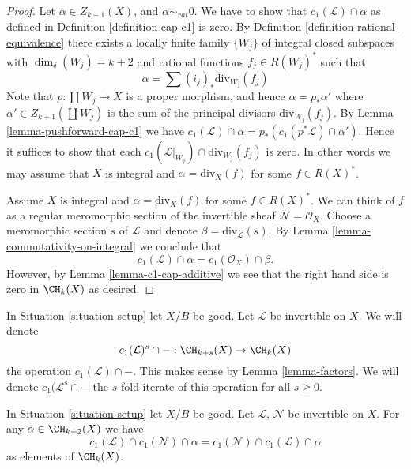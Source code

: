 \begin{proof}
Let $\alpha \in Z_{k + 1}(X)$, and $\alpha \sim_{rat} 0$.
We have to show that $c_1(\mathcal{L}) \cap \alpha$
as defined in Definition \ref{definition-cap-c1} is zero.
By Definition \ref{definition-rational-equivalence} there
exists a locally finite family $\{W_j\}$ of integral closed
subspaces with $\dim_\delta(W_j) = k + 2$ and rational functions
$f_j \in R(W_j)^*$ such that
$$
\alpha = \sum (i_j)_*\text{div}_{W_j}(f_j)
$$
Note that $p : \coprod W_j \to X$ is a proper morphism,
and hence $\alpha = p_*\alpha'$ where $\alpha' \in Z_{k + 1}(\coprod W_j)$
is the sum of the principal divisors $\text{div}_{W_j}(f_j)$.
By Lemma \ref{lemma-pushforward-cap-c1} we have
$c_1(\mathcal{L}) \cap \alpha = p_*(c_1(p^*\mathcal{L}) \cap \alpha')$.
Hence it suffices to show that each
$c_1(\mathcal{L}|_{W_j}) \cap \text{div}_{W_j}(f_j)$ is zero.
In other words we may assume that $X$ is integral and
$\alpha = \text{div}_X(f)$ for some $f \in R(X)^*$.

\medskip\noindent
Assume $X$ is integral and $\alpha = \text{div}_X(f)$ for some $f \in R(X)^*$.
We can think of $f$ as a regular meromorphic section of the invertible
sheaf $\mathcal{N} = \mathcal{O}_X$. Choose a meromorphic section
$s$ of $\mathcal{L}$ and denote $\beta = \text{div}_\mathcal{L}(s)$.
By Lemma \ref{lemma-commutativity-on-integral}
we conclude that
$$
c_1(\mathcal{L}) \cap \alpha = c_1(\mathcal{O}_X) \cap \beta.
$$
However, by Lemma \ref{lemma-c1-cap-additive} we see that the right hand side
is zero in $\CH_k(X)$ as desired.
\end{proof}

\noindent
In Situation \ref{situation-setup} let $X/B$ be good.
Let $\mathcal{L}$ be invertible on $X$.
We will denote
$$
c_1(\mathcal{L})^s \cap - : \CH_{k + s}(X) \to \CH_k(X)
$$
the operation $c_1(\mathcal{L}) \cap - $. This makes sense by
Lemma \ref{lemma-factors}. We will denote $c_1(\mathcal{L}^s \cap -$
the $s$-fold iterate of this operation for all $s \geq 0$.

\begin{lemma}
\label{lemma-cap-commutative}
In Situation \ref{situation-setup} let $X/B$ be good.
Let $\mathcal{L}$, $\mathcal{N}$ be invertible on $X$.
For any $\alpha \in \CH_{k + 2}(X)$ we have
$$
c_1(\mathcal{L}) \cap c_1(\mathcal{N}) \cap \alpha
=
c_1(\mathcal{N}) \cap c_1(\mathcal{L}) \cap \alpha
$$
as elements of $\CH_k(X)$.
\end{lemma}

